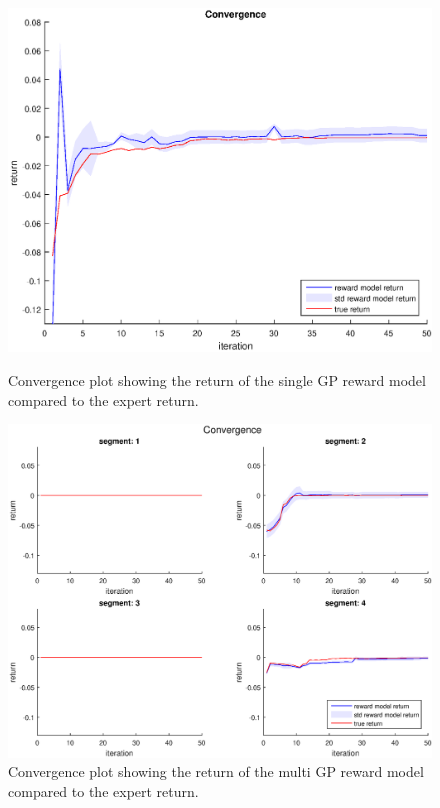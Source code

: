 \documentclass[mscThesis.tex]{subfiles}
\begin{document}

\begin{figure}[!htb]
    \centering
    \begin{minipage}{.5\textwidth}
        \centering
        \includegraphics[width=\textwidth, keepaspectratio=1]{figures/results/advancedx-var/convergence_single_noise.eps}
        \caption{Convergence plot showing the return of the single GP reward model compared to the expert return.}
        \label{fig:adxvar-single-noise-con}
    \end{minipage}%
    \begin{minipage}{0.5\textwidth}
        \centering
        \includegraphics[width=\textwidth, keepaspectratio=1]{figures/results/advancedx-var/convergence_multi_noise.eps}
        \caption{Convergence plot showing the return of the multi GP reward model compared to the expert return.}
        \label{fig:adxvar-multi-noise-con}
    \end{minipage}
\end{figure}
\end{document}

